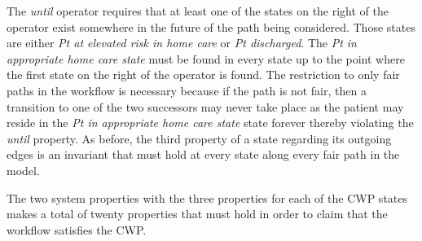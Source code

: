 The \emph{until} operator requires that at least one of the states on the right of the operator exist somewhere in the future of the path being considered. Those states are either \emph{Pt at elevated risk in home care} or \emph{Pt discharged}. The \emph{Pt in appropriate home care state} must be found in every state up to the point where the first state on the right of the operator is found. The restriction to only fair paths in the workflow is necessary because if the path is not fair, then a transition to one of the two successors may never take place as the patient may reside in the \emph{Pt in appropriate home care state} state forever thereby violating the \emph{until} property. As before, the third property of a state regarding its outgoing edges is an invariant that must hold at every state along every fair path in the model. 

The two system properties with the three properties for each of the CWP states makes a total of twenty properties that must hold in order to claim that the workflow satisfies the CWP.